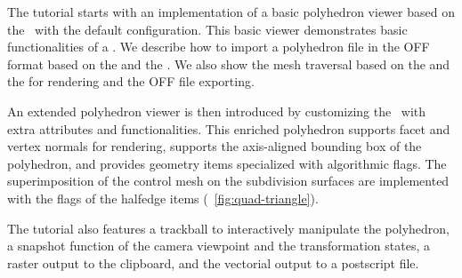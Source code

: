 The tutorial starts with an implementation of 
a basic polyhedron viewer based on the \cgalpoly\ with the 
default configuration.
This basic viewer demonstrates basic functionalities of a 
\cgalpoly . We describe how to import a polyhedron file in 
the OFF format based on the  and the 
. We also show the mesh traversal based on
the  and the  for rendering and 
the OFF file exporting. 

An extended polyhedron viewer is then introduced by customizing 
the \poly\ with extra attributes and functionalities. This 
enriched polyhedron supports facet and vertex normals for rendering, 
supports the axis-aligned bounding box of the polyhedron, and 
provides geometry items specialized with algorithmic flags. 
The superimposition of the control mesh on the subdivision surfaces
are implemented with the flags of the halfedge items 
(\figurename\ \ref{fig:quad-triangle}). 

The tutorial also features a trackball to interactively manipulate the
polyhedron, a snapshot function of the camera viewpoint and 
the transformation states, a raster output to the clipboard, and the
vectorial output to a postscript file.%
